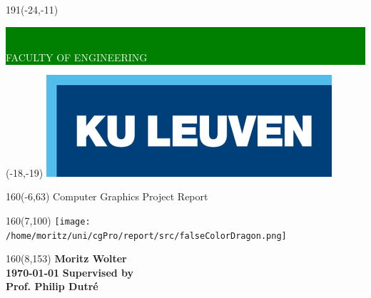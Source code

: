 

\thispagestyle{empty}
\newcommand{\form}[1]{\scalebox{1.087}{\boldmath{#1}}}
\sffamily
%
\begin{textblock}{191}(-24,-11)
\colorbox{green}{\hspace{139mm}\ \parbox[c][18truemm]{60mm}{\textcolor{white}{FACULTY OF ENGINEERING}}}
\end{textblock}
%
\begin{textblock}{70}(-18,-19)
\textblockcolour{}
\includegraphics*[height=19.8truemm]{./src/LogoKULeuven}
\end{textblock}
%
\begin{textblock}{160}(-6,63)
\textblockcolour{}
\vspace{-\parskip}
\flushleft
\fontsize{40}{42}\selectfont \textcolor{bluetitle}{Computer Graphics Project Report }\\[1.5mm]
\end{textblock}
%
\vspace{-\parskip}
\begin{textblock}{160}(7,100)
\texttt{[image: /home/moritz/uni/cgPro/report/src/falseColorDragon.png]}
\end{textblock}
%
\begin{textblock}{160}(8,153)
\textblockcolour{}
\vspace{-\parskip}
\flushright
\fontsize{14}{16}\selectfont \textbf{Moritz Wolter \\ \today}
\flushright
\fontsize{14}{16}\selectfont \textbf{Supervised by \\ Prof. Philip Dutr\'e}
\end{textblock}
